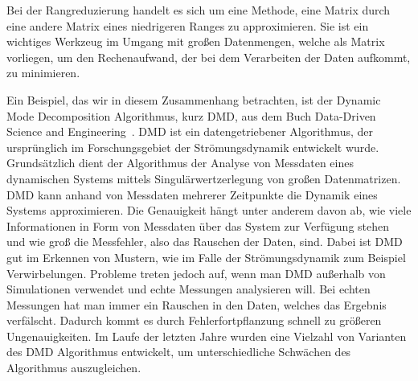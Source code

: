 \documentclass[../Bachelor_LennartKoliwer.tex]{subfiles}
\begin{document}
Bei der Rangreduzierung handelt es sich um eine Methode, eine Matrix durch eine andere Matrix eines niedrigeren Ranges zu approximieren. 
Sie ist ein wichtiges Werkzeug im Umgang mit großen Datenmengen, welche als Matrix vorliegen, um den Rechenaufwand, der bei dem Verarbeiten der Daten aufkommt, zu minimieren.

Ein Beispiel, das wir in diesem Zusammenhang betrachten, ist der Dynamic Mode Decomposition Algorithmus, kurz DMD, aus dem Buch \glqq Data-Driven Science and Engineer\-ing\grqq\ \cite{SlaySlaySlay}.
DMD ist ein datengetriebener Algorithmus, der ursprünglich im Forschungsgebiet der Strömungsdynamik entwickelt wurde. 
Grundsätzlich dient der Algorithmus der Analyse von Messdaten eines dynamischen Systems mittels Singulärwert\-zerlegung von großen Datenmatrizen.
DMD kann anhand von Messdaten mehrerer Zeitpunkte die Dynamik eines Systems approximieren. 
Die Genauigkeit hängt unter anderem davon ab, wie viele Informationen in Form von Messdaten über das System zur Verfügung stehen und wie groß die Messfehler, also das Rauschen der Daten, sind.
Dabei ist DMD gut im Erkennen von Mustern, wie im Falle der Strömungsdynamik zum Beispiel Verwirbelungen. 
Probleme treten jedoch auf, wenn man DMD außerhalb von Simulationen verwendet und echte Messungen analysieren will. 
Bei echten Messungen hat man immer ein Rauschen in den Daten, welches das Ergebnis verfälscht.
Dadurch kommt es durch Fehlerfortpflanzung schnell zu größeren Ungenauigkeiten.
Im Laufe der letzten Jahre wurden eine Vielzahl von Varianten des DMD Algorithmus entwickelt, um unterschiedliche Schwächen des Algorithmus auszugleichen.
\end{document}
